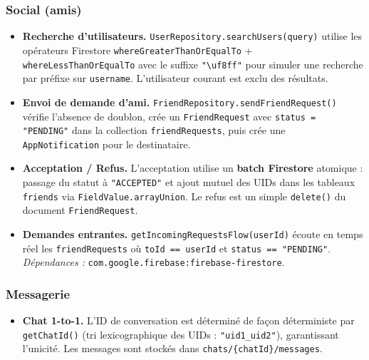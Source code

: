 \documentclass[a4paper, 12pt]{article}
\begin{document}
\begin{justify}
\begin{itemize}
\end{itemize}

\subsubsection*{Social (amis)}

\begin{itemize}

    \item \textbf{Recherche d'utilisateurs.}
    \texttt{UserRepository.\allowbreak{}searchUsers(query)} utilise les opérateurs Firestore \texttt{whereGreaterThanOrEqualTo} + \texttt{whereLessThanOrEqualTo} avec le suffixe \texttt{"\textbackslash uf8ff"} pour simuler une recherche par préfixe sur \texttt{username}. L'utilisateur courant est exclu des résultats.

    \item \textbf{Envoi de demande d'ami.}
    \texttt{FriendRepository.\allowbreak{}sendFriendRequest()} vérifie l'absence de doublon, crée un \texttt{FriendRequest} avec \texttt{status = "PENDING"} dans la collection \texttt{friendRequests}, puis crée une \texttt{AppNotification} pour le destinataire.

    \item \textbf{Acceptation / Refus.}
    L'acceptation utilise un \textbf{batch Firestore} atomique : passage du statut à \texttt{"ACCEPTED"} et ajout mutuel des UIDs dans les tableaux \texttt{friends} via \texttt{FieldValue.\allowbreak{}arrayUnion}. Le refus est un simple \texttt{delete()} du document \texttt{FriendRequest}.

    \item \textbf{Demandes entrantes.}
    \texttt{getIncomingRequestsFlow(userId)} écoute en temps réel les \texttt{friendRequests} où \texttt{toId == userId} et \texttt{status == "PENDING"}.
    \newline\textit{Dépendances :} \texttt{com.\allowbreak{}google.\allowbreak{}firebase:\allowbreak{}firebase-firestore}.

\end{itemize}

\subsubsection*{Messagerie}

\begin{itemize}

    \item \textbf{Chat 1-to-1.}
    L'ID de conversation est déterminé de façon déterministe par \texttt{getChatId()} (tri lexicographique des UIDs : \texttt{"uid1\_uid2"}), garantissant l'unicité. Les messages sont stockés dans \texttt{chats/\allowbreak{}\{chatId\}/\allowbreak{}messages}.


\end{itemize}
\end{justify}
\end{document}
